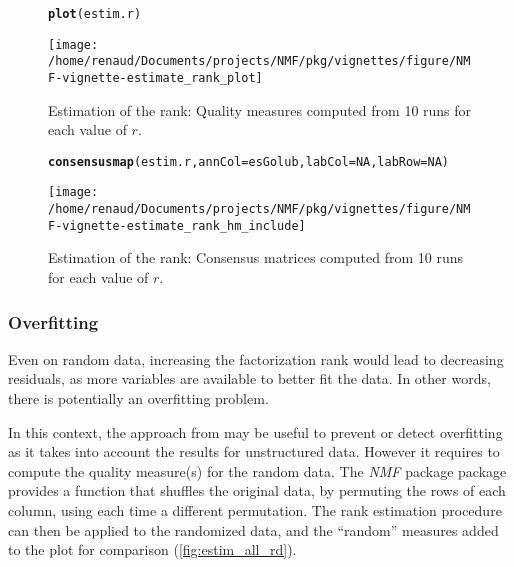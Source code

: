 \documentclass[a4paper]{article}\usepackage{graphicx, color}
\makeatletter
\def\maxwidth{ %
  \ifdim\Gin@nat@width>\linewidth
    \linewidth
  \else
    \Gin@nat@width
  \fi
}
\newcommand{\hlfunctioncall}[1]{\textcolor[rgb]{0.501960784313725,0,0.329411764705882}{\textbf{#1}}}%
\newenvironment{kframe}{%
 \def\at@end@of@kframe{}%
 \ifinner\ifhmode%
  \def\at@end@of@kframe{\end{minipage}}%
  \begin{minipage}{\columnwidth}%
 \fi\fi%
 \def\FrameCommand##1{\hskip\@totalleftmargin \hskip-\fboxsep
 \colorbox{shadecolor}{##1}\hskip-\fboxsep
     \hskip-\linewidth \hskip-\@totalleftmargin \hskip\columnwidth}%
 \MakeFramed {\advance\hsize-\width
   \@totalleftmargin\z@ \linewidth\hsize
   \@setminipage}}%
 {\par\unskip\endMakeFramed%
 \at@end@of@kframe}
\newenvironment{knitrout}{}{} %
\newcommand{\pkgname}[1]{\textit{#1}\xspace}
\newcommand{\Rpkg}[1]{\pkgname{#1} package\xspace}
\newcommand{\nmfpack}{\Rpkg{NMF}}
\renewcommand{\cite}[1]{\parencite{#1}}
\makeatother
\begin{document}
\begin{figure}
\begin{knitrout}
\color{fgcolor}\begin{kframe}
\begin{alltt}
\hlfunctioncall{plot}(estim.r)
\end{alltt}
\end{kframe}\texttt{[image: /home/renaud/Documents/projects/NMF/pkg/vignettes/figure/NMF-vignette-estimate\_rank\_plot]} 
\end{knitrout}

\caption{Estimation of the rank: Quality measures computed from 10 runs for each value of $r$. \label{fig:estim_all}}
\end{figure}

\begin{figure}
\begin{knitrout}
\color{fgcolor}\begin{kframe}
\begin{alltt}
\hlfunctioncall{consensusmap}(estim.r, annCol = esGolub, labCol = NA, labRow = NA)
\end{alltt}
\end{kframe}\texttt{[image: /home/renaud/Documents/projects/NMF/pkg/vignettes/figure/NMF-vignette-estimate\_rank\_hm\_include]} 
\end{knitrout}

\caption{Estimation of the rank: Consensus matrices computed from 10 runs for each value of $r$. \label{fig:estim_all_hm}}
\end{figure}

\subsubsection{Overfitting}
Even on random data, increasing the factorization rank would lead to decreasing residuals, as more variables are available to better fit the data.
In other words, there is potentially an overfitting problem. 
 
In this context, the approach from \cite{Frigyesi2008} may be useful to prevent or detect overfitting as it takes into account the results for unstructured data.
However it requires to compute the quality measure(s) for the random data.
The \nmfpack package provides a function that shuffles the original data, by permuting the rows of each column, using each time a different permutation.
The rank estimation procedure can then be applied to the randomized data, and the ``random'' measures added to the plot for comparison (\cref{fig:estim_all_rd}).
\end{document}
